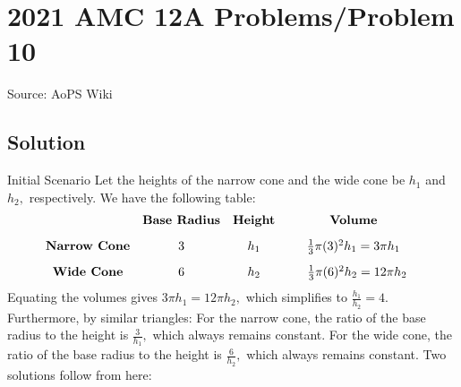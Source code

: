 \documentclass[12pt]{article}
\begin{document}
\section*{{2021 AMC 12A Problems/Problem 10}}
Source: AoPS Wiki

\subsection*{Solution}
Initial Scenario Let the heights of the narrow cone and the wide cone be $h_1$ and $h_2,$ respectively. We have the following table: \[\begin{array}{cccccc} & \textbf{Base Radius} & \textbf{Height} & & \textbf{Volume} & \\ [2ex] \textbf{Narrow Cone} & 3 & h_1 & & \frac13\pi(3)^2h_1=3\pi h_1 & \\ [2ex] \textbf{Wide Cone} & 6 & h_2 & & \hspace{2mm}\frac13\pi(6)^2h_2=12\pi h_2 & \end{array}\] Equating the volumes gives $3\pi h_1=12\pi h_2,$ which simplifies to $\frac{h_1}{h_2}=4.$ Furthermore, by similar triangles: For the narrow cone, the ratio of the base radius to the height is $\frac{3}{h_1},$ which always remains constant. For the wide cone, the ratio of the base radius to the height is $\frac{6}{h_2},$ which always remains constant. Two solutions follow from here:
\end{document}
